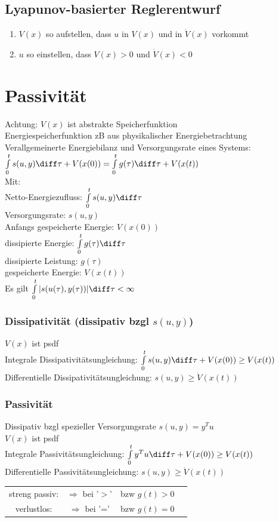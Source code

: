 \documentclass[german]{latex4ei/latex4ei_sheet}
\begin{document}
\subsection{Lyapunov-basierter Reglerentwurf}
\begin{enumerate}
  \item $V(x)$ so aufstellen, dass $u$ in $V(x)$ und in $\dot{V}(x)$ vorkommt
  \item $u$ so einstellen, dass $V(x) > 0$ und $\dot{V}(x) < 0$
\end{enumerate}


\section{Passivität}
Achtung: $V(x)$ ist abstrakte Speicherfunktion \\
Energiespeicherfunktion zB aus physikalischer Energiebetrachtung\\

Verallgemeinerte Energiebilanz und Versorgungsrate eines Systems:\\
$\int\limits_{0}^{t} s(u,y) \diff \tau + V(x(0)) = \int\limits_{0}^{t} g(\tau) \diff \tau + V(x(t))$  \\
Mit: \\
Netto-Energiezufluss: $\int\limits_{0}^{t} s(u,y) \diff \tau$ \\
Versorgungsrate: $s(u,y)$ \\
Anfangs gespeicherte Energie: $V(x(0))$ \\
dissipierte Energie: $\int\limits_{0}^{t} g(\tau) \diff \tau$ \\
dissipierte Leistung: $g(\tau)$ \\
gespeicherte Energie: $V(x(t))$ \\
Es gilt $\int\limits_{0}^{t}|s(u(\tau), y(\tau))| \diff \tau < \infty$

\subsubsection*{Dissipativität (dissipativ bzgl $s(u,y)$)}
$V(x)$ ist psdf \\
Integrale Dissipativitätsungleichung: $\int\limits_{0}^{t} s(u,y) \diff \tau + V(x(0)) \geq V(x(t))$ \\
Differentielle Dissipativitätsungleichung: $s(u,y) \geq \dot{V}(x(t))$

\subsubsection*{Passivität}
Dissipativ bzgl spezieller Versorgungsrate $s(u,y) = y^T u$ \\
$V(x)$ ist psdf \\
Integrale Passivitätsungleichung: $\int\limits_{0}^{t} y^T u \diff \tau + V(x(0)) \geq V(x(t))$ \\
Differentielle Passivitätsungleichung: $s(u,y) \geq \dot{V}(x(t))$ \\
\begin{tabular}{cccc}
  streng passiv: &  $\Rightarrow$ bei '$>$' & bzw $g(t) > 0$ \\
  verlustlos:    &  $\Rightarrow$ bei '=' & bzw $g(t) = 0$
\end{tabular}
\end{document}

